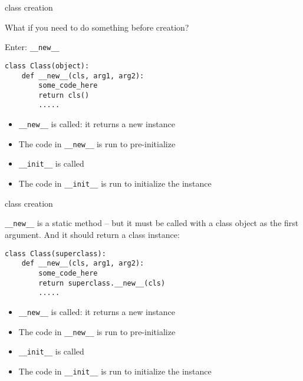 \documentclass{beamer}
\begin{document}
\begin{frame}[fragile]{class creation}

{\Large What if you need to do something before creation?}

\vfill
{\Large Enter: \verb|__new__|}

\vfill
\begin{verbatim}
class Class(object):
    def __new__(cls, arg1, arg2):
        some_code_here
        return cls()
        .....
\end{verbatim}

\vfill
\begin{itemize}
  \item \verb|__new__| is called: it returns a new instance
  \item The code in \verb|__new__| is run to pre-initialize
  \item \verb|__init__| is called
  \item The code in \verb|__init__| is run to initialize the instance
\end{itemize}
\vfill

\end{frame} 


\begin{frame}[fragile]{class creation}

{\large \verb|__new__| is a static method -- but it must be called with a class object as the first argument. And it should return a class instance: }

\vfill
\begin{verbatim}
class Class(superclass):
    def __new__(cls, arg1, arg2):
        some_code_here
        return superclass.__new__(cls)
        .....
\end{verbatim}

\vfill
\begin{itemize}
  \item \verb|__new__| is called: it returns a new instance
  \item The code in \verb|__new__| is run to pre-initialize
  \item \verb|__init__| is called
  \item The code in \verb|__init__| is run to initialize the instance
\end{itemize}
\vfill

\end{frame} 
\end{document}
